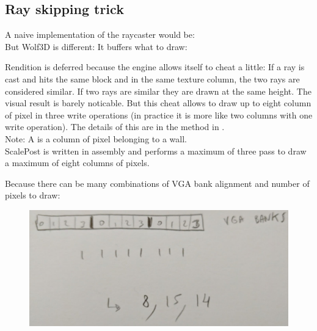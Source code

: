 \documentclass[book.tex]{subfiles}
\begin{document}
\subsection{Ray skipping trick}
A naive implementation of the raycaster would be:\\

But Wolf3D is different: It buffers what to draw:


Rendition is deferred because the engine allows itself to cheat a little: If a ray is cast and hits the same block and in the same
texture column, the two rays are considered similar. If two rays are similar they are drawn at the same height. The visual result is 
barely noticable. But this cheat allows to draw up to eight column of pixel in three write operations (in practice it is more like two columns
with one write operation). The details of this are in the method  in .\\

Note: A  is a column of pixel belonging to a wall.\\
ScalePost is written in assembly and performs a maximum of three pass to draw a maximum of eight columns of pixels.

Because there can be many combinations of VGA bank alignment and number of pixels to draw:

\begin{figure}[H]
\centering
 \includegraphics[scale=0.3]{imgs/scalePost_explanation1.png}
 \end{figure}
 
\end{document}
